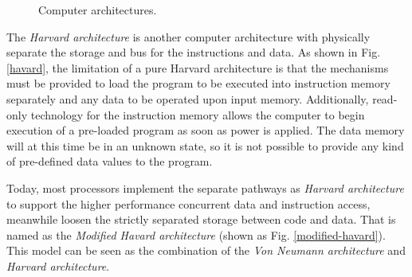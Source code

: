 \begin{figure}[t]
	\centering
	\hspace{8.5pt}
	\hspace{8.5pt}
	\caption{ Computer architectures.}
	\label{cpu-arch}
\end{figure}

The \textit{Harvard architecture} is another computer architecture with physically separate the storage and bus for the instructions and data. As shown in Fig. \ref{havard}, the limitation of a pure Harvard architecture is that the mechanisms must be provided to load the program to be executed into instruction memory separately and any data to be operated upon input memory. Additionally, read-only technology for the instruction memory allows the computer to begin execution of a pre-loaded program as soon as power is applied. The data memory will at this time be in an unknown state, so it is not possible to provide any kind of pre-defined data values to the program.

Today, most processors implement the separate pathways as \textit{Harvard architecture} to support the higher performance concurrent data and instruction access, meanwhile loosen the strictly separated storage between code and data. That is named as the \textit{Modified Havard architecture} (shown as Fig. \ref{modified-havard}). This model can be seen as the combination of the \textit{Von Neumann architecture} and  \textit{Harvard architecture}.

